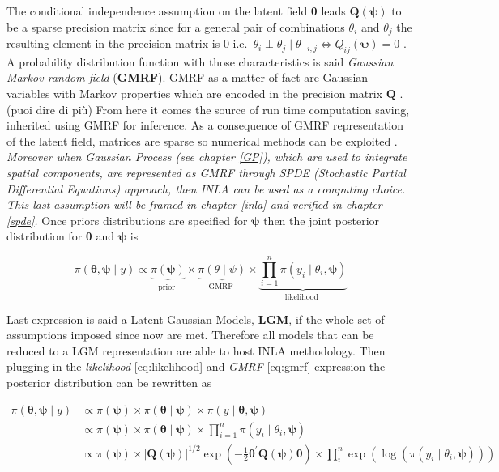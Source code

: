 \documentclass[
  12pt,
  a4paper,
  oneside]{book}
\begin{document}
The conditional independence assumption on the latent field \(\boldsymbol{\theta}\) leads \(\boldsymbol{Q(\psi)}\) to be a sparse precision matrix since for a general pair of combinations \(\theta_{i}\) and \(\theta_{j}\) the resulting element in the precision matrix is 0 i.e.~\(\theta_{i} \perp \theta_{j} \mid \theta_{-i, j} \Longleftrightarrow Q_{i j}(\boldsymbol{\psi})=0\) \citeyearpar{Blangiardo-Cameletti}.
A probability distribution function with those characteristics is said \emph{Gaussian Markov random field} (\textbf{GMRF}). GMRF as a matter of fact are Gaussian variables with Markov properties which are encoded in the precision matrix \(\boldsymbol{Q}\) \citep{Rue2009}. (puoi dire di più)
From here it comes the source of run time computation saving, inherited using GMRF for inference. As a consequence of GMRF representation of the latent field, matrices are sparse so numerical methods can be exploited \citep{Blangiardo-Cameletti}. \emph{Moreover when Gaussian Process (see chapter \ref{GP}), which are used to integrate spatial components, are represented as GMRF through SPDE (Stochastic Partial Differential Equations) approach, then INLA can be used as a computing choice. This last assumption will be framed in chapter \ref{inla} and verified in chapter \ref{spde}.}
Once priors distributions are specified for \(\boldsymbol{\psi}\) then the joint posterior distribution for \(\boldsymbol{\theta}\) and \(\boldsymbol{\psi}\) is

\[
\pi(\boldsymbol{\theta}, \boldsymbol{\psi} \mid y)\propto  \underbrace{\pi(\boldsymbol{\psi})}_{\text {prior }} \times \underbrace{\pi(\theta \mid \psi)}_{\text {GMRF }} \times \underbrace{\prod_{i=1}^{n} \pi\left(y_{i} \mid \theta_{i}, \boldsymbol{\psi}\right)}_{\text {likelihood }}
\]

Last expression is said a Latent Gaussian Models, \textbf{LGM}, if the whole set of assumptions imposed since now are met. Therefore all models that can be reduced to a LGM representation are able to host INLA methodology.
Then plugging in the \emph{likelihood} \eqref{eq:likelihood} and \emph{GMRF} \eqref{eq:gmrf} expression the posterior distribution can be rewritten as

\[
\begin{aligned}
\pi(\boldsymbol{\theta}, \boldsymbol{\psi} \mid y) & \propto \pi(\boldsymbol{\psi}) \times \pi(\boldsymbol{\theta} \mid \boldsymbol{\psi}) \times \pi(y \mid \boldsymbol{\theta}, \boldsymbol{\psi}) \\
& \propto \pi(\boldsymbol{\psi}) \times \pi(\boldsymbol{\theta} \mid \boldsymbol{\psi}) \times \prod_{i=1}^{n} \pi\left(y_{i} \mid \theta_{i}, \boldsymbol{\psi}\right) \\
& \propto \pi(\boldsymbol{\psi}) \times|\boldsymbol{Q}(\boldsymbol{\psi})|^{1 / 2} \exp \left(-\frac{1}{2} \boldsymbol{\theta}^{\prime} \boldsymbol{Q}(\boldsymbol{\psi}) \boldsymbol{\theta}\right) \times \prod_{i}^{n} \exp \left(\log \left(\pi\left(y_{i} \mid \theta_{i}, \boldsymbol{\psi}\right)\right)\right)
\end{aligned}
\]
\end{document}
